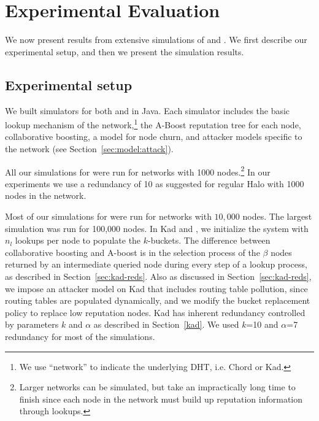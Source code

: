 

\section{Experimental Evaluation}
\label{sec:eval}

We now present results from extensive simulations of \hsys and \ksys. We
first describe our experimental setup, and then we present the simulation
results.
\subsection{Experimental setup}
\label{sec:setup}
We built simulators for both \hsys and \ksys in Java. Each simulator
includes the basic lookup mechanism of the network,\footnote{We use  ``network'' to indicate the underlying DHT,
  i.e. Chord or Kad.} the A-Boost reputation tree for each node,
collaborative boosting, a model for node churn, and attacker models
specific to the network (see Section~\ref{sec:model:attack}).




All our simulations for \hsys were run for networks with 1000
nodes.\footnote{Larger networks can be simulated, but take an
  impractically long time to finish since each node in the network must
  build up reputation information through lookups.} In our experiments
we use a redundancy of 10 as suggested for regular Halo with 1000 nodes
in the network. 


Most of our simulations for \ksys were run for networks with $10,000$
nodes. The largest simulation was run for 100,000 nodes. In Kad and
\ksys, we initialize the system with $n_l$ lookups per node to populate
the $k$-buckets. The difference between collaborative boosting and
A-boost is in the selection process of the $\beta$ nodes returned by an
intermediate queried node during every step of a lookup process, as
described in Section~\ref{sec:kad-reds}.
Also as discussed in Section~\ref{sec:kad-reds}, we impose an attacker
model on Kad that includes routing table pollution, since routing tables
are populated dynamically, and we modify the bucket replacement policy
to replace low reputation nodes.
Kad has inherent redundancy controlled by
parameters $k$ and $\alpha$ as described in Section~\ref{kad}. We
used $k$=10 and $\alpha$=7 redundancy for most of the simulations.


